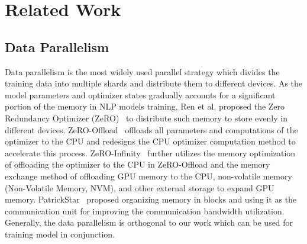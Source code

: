 \section{Related Work}
\label{sec:related}
\subsection{Data Parallelism}
Data parallelism is the most widely used parallel strategy which
divides the training data into multiple shards and distribute them to different devices.
As the model parameters and optimizer states gradually
accounts for a significant portion of the memory in NLP models training,
Ren et al. proposed the Zero Redundancy Optimizer (ZeRO)~\cite{rajbhandariZeROMemoryOptimizations2020}
to distribute such memory to store evenly in different devices.
ZeRO-Offload~\cite{renZerooffloadDemocratizingBillionScale2021} offloads all parameters and computations of the optimizer
to the CPU and redesigns the CPU optimizer computation method to accelerate this process.
ZeRO-Infinity~\cite{rajbhandariZeROinfinityBreakingGPU2021} further utilizes the memory optimization of offloading
the optimizer to the CPU in ZeRO-Offload
and the memory exchange method of offloading GPU memory to the CPU,
non-volatile memory (Non-Volatile Memory, NVM),
and other external storage to expand GPU memory.
PatrickStar~\cite{fangParallelTrainingPreTrained2022} proposed organizing memory in blocks and
using it as the communication unit for improving
the communication bandwidth utilization.
Generally, the data parallelism is orthogonal to our work
which can be used for training model in conjunction.

